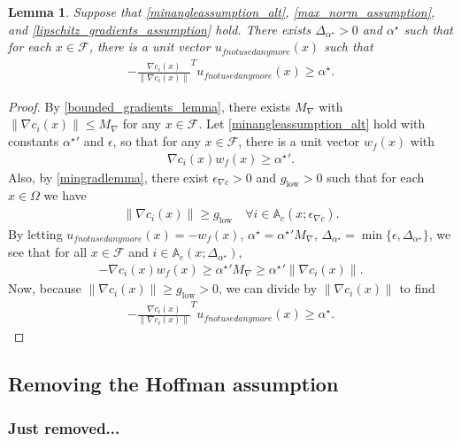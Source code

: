 \documentclass{article}
\newtheorem{lemma}[theorem]{Lemma}
\theoremstyle{case}
\numberwithin{theorem}{subsection}
\newcommand{\feasible}{{\mathcal F}}
\newcommand{\maxgrad}{{M_{\nabla}}}
\newcommand{\minanglealpha}{{ \alpha^{\star} }}
\newcommand{\minangledelta}{{\Delta_{\alpha^{\star}}}}
\newcommand{\mingradepsilon}{{\epsilon_{\nabla c}}}
\newcommand{\mingrad}{{ g_{\textrm{low}} }}
\newcommand{\minanglediralt}{{w_f}}
\newcommand{\minangledir}{{u_{f not used anymore}}}
\newcommand{\epsactive}{{\mathbb A_c}}
\begin{document}
\color{red}
\begin{lemma}
\label{minanglelemmap1}
Suppose that \cref{minangleassumption_alt}, \cref{max_norm_assumption}, and \cref{lipschitz_gradients_assumption} hold.
There exists $\minangledelta > 0$ and $\minanglealpha$ such that for each $x \in \feasible$, there is a unit vector $\minangledir(x)$ such that
\begin{align*}
-\frac {\nabla c_i(x)}{\|\nabla c_i(x)\|}^T \minangledir(x) \ge \minanglealpha.
\end{align*}
\end{lemma}
\begin{proof}
By \cref{bounded_gradients_lemma}, there exists $\maxgrad$ with $\|\nabla c_i(x) \| \le \maxgrad$ for any $x \in \feasible$.
Let \cref{minangleassumption_alt} hold with constants $\minanglealpha'$ and $\epsilon$, so that for any $x \in \feasible$, there is a unit vector $\minanglediralt(x)$ with
\begin{align*}
\nabla c_i(x)\minanglediralt(x) \ge \minanglealpha'.
\end{align*}
Also, by \cref{mingradlemma}, there exist $\mingradepsilon > 0$ and $\mingrad > 0$ such that for each $x \in \Omega$ we have
\begin{align*}
\| \nabla c_i(x) \| \ge \mingrad \quad \forall i \in \epsactive(x; \mingradepsilon).
\end{align*}
By letting $\minangledir(x) = -\minanglediralt(x)$, $\minanglealpha = \minanglealpha'\maxgrad$, $\minangledelta = \min\{\epsilon, \minangledelta\}$, 
we see that for all $x \in \feasible$ and $i \in \epsactive(x; \minangledelta)$,
\begin{align*}
-\nabla c_i(x) \minanglediralt(x) \ge \minanglealpha'\maxgrad \ge \minanglealpha'\|\nabla c_i(x)\|.
\end{align*}
Now, because $\| \nabla c_i(x) \| \ge \mingrad > 0$, we can divide by $\| \nabla c_i(x) \|$ to find
\begin{align*}
-\frac {\nabla c_i(x)}{\|\nabla c_i(x)\|}^T \minangledir(x) \ge \minanglealpha.
\end{align*}
\end{proof}
\color{black}


\subsection{Removing the Hoffman assumption}
\label{removing_the_huffman_assumption}



\subsubsection{Just removed...}
\end{document}
